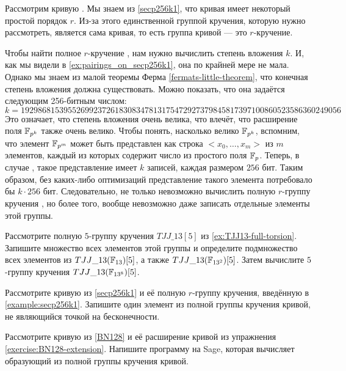 \begin{example} 
\label{example:secp256k1}
Рассмотрим кривую . Мы знаем из \examplename{} \ref{secp256k1}, что кривая имеет некоторый простой порядок $r$. Из-за этого единственной группой кручения, которую нужно рассмотреть, является сама кривая, то есть группа кривой — это $r$-кручение. 

Чтобы найти полное $r$-кручение , нам нужно вычислить степень вложения $k$. И, как мы видели в \ref{ex:pairings_on_secp256k1}, она по крайней мере не мала. Однако мы знаем из малой теоремы Ферма \ref{fermats-little-theorem}, что конечная степень вложения должна существовать. Можно показать, что она задаётся следующим 256-битным числом:
$$
k = \scriptstyle 192986815395526992372618308347813175472927379845817397100860523586360249056 
$$
Это означает, что степень вложения очень велика, что влечёт, что расширение поля $\mathbb{F}_{p^k}$ также очень велико. Чтобы понять, насколько велико $\mathbb{F}_{p^k}$, вспомним, что элемент $\mathbb{F}_{p^m}$ может быть представлен как строка $<x_0,\ldots,x_m>$ из $m$ элементов, каждый из которых содержит число из простого поля $\mathbb{F}_p$. Теперь, в случае , такое представление имеет $k$ записей, каждая размером $256$ бит. Таким образом, без каких-либо оптимизаций представление такого элемента потребовало бы $k\cdot 256$ бит. Следовательно, не только невозможно вычислить полную $r$-группу кручения , но более того, вообще невозможно даже записать отдельные элементы этой группы. 
\end{example}
\begin{exercise} Рассмотрите полную $5$-группу кручения $TJJ\_13[5]$ из \examplename{} \ref{ex:TJJ13-full-torsion}. Запишите множество всех элементов этой группы и определите подмножество всех элементов из $TJJ\_13(\mathbb{F}_{13})[5]$, а также $TJJ\_13(\mathbb{F}_{13^2})[5]$. Затем вычислите $5$-группу кручения $TJJ\_13(\mathbb{F}_{13^{8}})[5]$.
\end{exercise}
\begin{exercise} Рассмотрите кривую  из \examplename{} \ref{secp256k1} и её полную $r$-группу кручения, введённую в \examplename{} \ref{example:secp256k1}. Запишите один элемент из полной группы кручения кривой, не являющийся точкой на бесконечности.
\end{exercise}
\begin{exercise}
\label{exercise:BN128-full-torsion}
 Рассмотрите кривую  из \examplename{} \ref{BN128} и её расширение кривой из упражнения \ref{exercise:BN128-extension}. Напишите программу на Sage, которая вычисляет образующий из полной группы кручения кривой.
\end{exercise}

